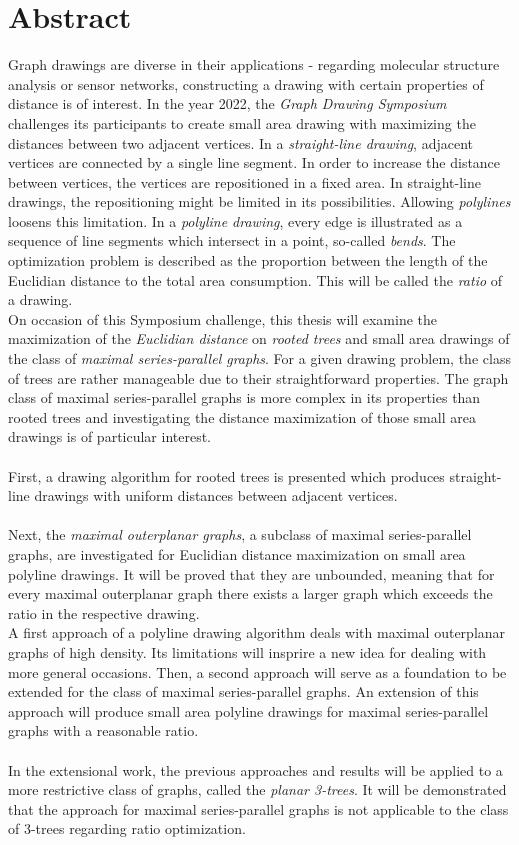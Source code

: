 \section*{Abstract}
Graph drawings are diverse in their applications - regarding molecular structure analysis or sensor networks, constructing a drawing with certain properties of distance is of interest. In the year 2022, the \emph{Graph Drawing Symposium} challenges its participants to create small area drawing with maximizing the distances between two adjacent vertices. In a \emph{straight-line drawing}, adjacent vertices are connected by a single line segment. In order to increase the distance between vertices, the vertices are repositioned in a fixed area. In straight-line drawings, the repositioning might be limited in its possibilities. 
Allowing \emph{polylines} loosens this limitation. In a \emph{polyline drawing}, every edge is illustrated as a sequence of line segments which intersect in a point, so-called \textit{bends}. The optimization problem is described as the proportion between the length of the Euclidian distance to the total area consumption. This will be called the \emph{ratio} of a drawing.
\\
On occasion of this Symposium challenge, this thesis will examine the maximization of the \emph{Euclidian distance} on \emph{rooted trees} and small area drawings of the class of \emph{maximal series-parallel graphs}. For a given drawing problem, the class of trees are rather manageable due to their straightforward properties. The graph class of maximal series-parallel graphs is more complex in its properties than rooted trees and investigating the distance maximization of those small area drawings is of particular interest.
\\\\
First, a drawing algorithm for rooted trees is presented which produces straight-line drawings with uniform distances between adjacent vertices.\\\\
Next, the \emph{maximal outerplanar graphs}, a subclass of maximal series-parallel graphs, are investigated for Euclidian distance maximization on small area polyline drawings. It will be proved that they are unbounded, meaning that for every maximal outerplanar graph there exists a larger graph which exceeds the ratio in the respective drawing.\\
A first approach of a polyline drawing algorithm deals with maximal outerplanar graphs of high density. Its limitations will insprire a new idea for dealing with more general occasions. Then, a second approach will serve as a foundation to be extended for the class of maximal series-parallel graphs. An extension of this approach will produce small area polyline drawings for maximal series-parallel graphs with a reasonable ratio.
\\\\
In the extensional work, the previous approaches and results will be applied to a more restrictive class of graphs, called the \emph{planar 3-trees}. It will be demonstrated that the approach for maximal series-parallel graphs is not applicable to the class of 3-trees regarding ratio optimization. 